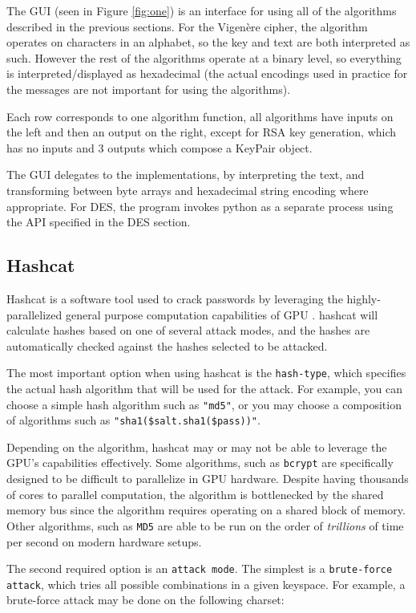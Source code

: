 \documentclass[acmlarge]{acmart}
\begin{document}
The GUI (seen in Figure \ref{fig:one}) is an interface for using all of the algorithms described in the previous sections. For the Vigen\`{e}re cipher, the algorithm operates on characters in an alphabet, so the key and text are both interpreted as such. However the rest of the algorithms operate at a binary level, so everything is interpreted/displayed as hexadecimal (the actual encodings used in practice for the messages are not important for using the algorithms).

Each row corresponds to one algorithm function, all algorithms have inputs on the left and then an output on the right, except for RSA key generation, which has no inputs and 3 outputs which compose a KeyPair object.

The GUI delegates to the implementations, by interpreting the text, and transforming between byte arrays and hexadecimal string encoding where appropriate. For DES, the program invokes python as a separate process using the API specified in the DES section.

\subsection{Hashcat}\label{sec:hashcat}

Hashcat is a software tool used to crack passwords by leveraging the highly-parallelized general purpose computation capabilities of GPU \cite{Hashcat}. hashcat will calculate hashes based on one of several attack modes, and the hashes are automatically checked against the hashes selected to be attacked.

The most important option when using hashcat is the \texttt{hash-type}, which specifies the actual hash algorithm that will be used for the attack. For example, you can choose a simple hash algorithm such as \texttt{"md5"}, or you may choose a composition of algorithms such as \texttt{"sha1(\$salt.sha1(\$pass))"}.

Depending on the algorithm, hashcat may or may not be able to leverage the GPU's capabilities effectively. Some algorithms, such as \texttt{bcrypt} are specifically designed to be difficult to parallelize in GPU hardware. Despite having thousands of cores to parallel computation, the algorithm is bottlenecked by the shared memory bus since the algorithm requires operating on a shared block of memory. Other algorithms, such as \texttt{MD5} are able to be run on the order of \textit{trillions} of time per second on modern hardware setups.

The second required option is an \texttt{attack mode}. The simplest is a \texttt{brute-force attack}, which tries all possible combinations in a given keyspace. For example, a brute-force attack may be done on the following charset:
\end{document}

